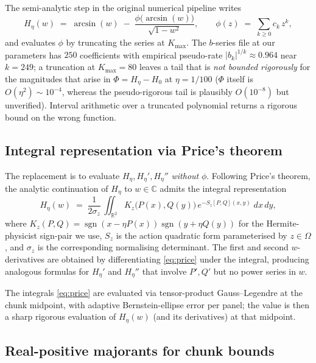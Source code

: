 \documentclass[11pt]{article}
\theoremstyle{definition}
\newcommand{\R}{\mathbb{R}}
\newcommand{\C}{\mathbb{C}}
\newcommand{\Heta}{H_{\eta}}
\newcommand{\HetaP}{H_{\eta}'}
\newcommand{\HetaPP}{H_{\eta}''}
\newcommand{\Om}{\Omega}
\newcommand{\sgn}{\operatorname{sgn}}
\begin{document}
The semi-analytic step in the original numerical pipeline writes
\begin{equation}\label{eq:phi-series}
   \Heta(w)
   \;=\;
   \arcsin(w) \;-\; \frac{\phi\bigl(\arcsin(w)\bigr)}{\sqrt{1-w^2}},
   \qquad
   \phi(z) \;=\; \sum_{k\ge 0} c_k\,z^k,
\end{equation}
and evaluates $\phi$ by truncating the series at $K_{\max}$. The $b$-series file at our
parameters has $250$ coefficients with empirical pseudo-rate $|b_k|^{1/k}\approx 0.964$
near $k=249$; a truncation at $K_{\max}=80$ leaves a tail that is \emph{not bounded
rigorously} for the magnitudes that arise in $\Phi=\Heta-H_0$ at $\eta=1/100$
($\Phi$ itself is $O(\eta^2)\sim 10^{-4}$, whereas the pseudo-rigorous tail is plausibly
$O(10^{-8})$ but unverified). Interval arithmetic over a truncated polynomial returns
a rigorous bound on the wrong function.

\subsection{Integral representation via Price's theorem}

The replacement is to evaluate $\Heta, \HetaP, \HetaPP$ \emph{without} $\phi$.
Following Price's theorem, the analytic continuation of $\Heta$ to $w\in\C$ admits
the integral representation
\begin{equation}\label{eq:price}
   \Heta(w)
   \;=\;
   \frac{1}{2\sigma_z}\,\iint_{\R^2}
       K_z\bigl(P(x), Q(y)\bigr)\,
       e^{-S_z[P,Q](x,y)}\;dx\,dy,
\end{equation}
where $K_z(P,Q)=\sgn(x-\eta P(x))\sgn(y+\eta Q(y))$ for the Hermite-physicist
sign-pair we use, $S_z$ is the action quadratic form parameterised by $z\in\Om$, and
$\sigma_z$ is the corresponding normalising determinant. The first and second
$w$-derivatives are obtained by differentiating \eqref{eq:price} under the integral,
producing analogous formulas for $\HetaP$ and $\HetaPP$ that involve $P', Q'$ but no
power series in $w$.

The integrals \eqref{eq:price} are evaluated via tensor-product Gauss--Legendre at the
chunk midpoint, with adaptive Bernstein-ellipse error per panel; the value is then a
sharp rigorous evaluation of $\Heta(w)$ (and its derivatives) at that midpoint.

\subsection{Real-positive majorants for chunk bounds}
\end{document}
